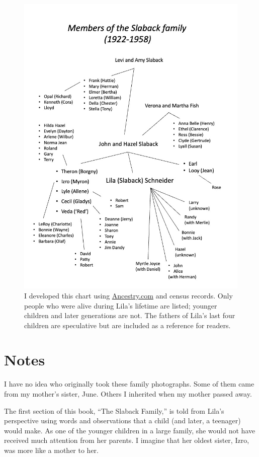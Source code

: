 \documentclass[
  letterpaper,
]{book}
\begin{document}
\begin{figure}[H]

{\centering \includegraphics[width=0.8\linewidth,height=\textheight,keepaspectratio]{images/Akou03.jpg}

}

\caption[Members of the Slaback Family 1922--1958]{I developed this
chart using \href{https://www.ancestry.com/}{Ancestry.com} and census
records. Only people who were alive during Lila's lifetime are listed;
younger children and later generations are not. The fathers of Lila's
last four children are speculative but are included as a reference for
readers.}

\end{figure}%

\section{Notes}\label{notes-1}

I have no idea who originally took these family photographs. Some of
them came from my mother's sister, June. Others I inherited when my
mother passed away.

The first section of this book, ``The Slaback Family,'' is told from
Lila's perspective using words and observations that a child (and later,
a teenager) would make. As one of the younger children in a large
family, she would not have received much attention from her parents. I
imagine that her oldest sister, Izro, was more like a mother to her.
\end{document}
